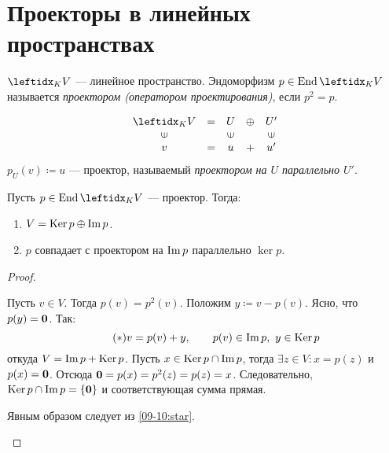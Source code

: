 \section{Проекторы в линейных пространствах}

\begin{defn}
    $\lsub{K}{V}$ --- линейное пространство. Эндоморфизм $p \in \End \lsub{K}{V}$ называется \textit{проектором (оператором проектирования)}, если $p^2 = p$.
\end{defn}

\begin{exmpl}
    $$\begin{array}{ c c c c c }
        \lsub{K}{V} & = & U     & \oplus & U'    \\
        \inup       &   & \inup &        & \inup \\
        v           & = & u     & +      & u'
    \end{array}$$
    $p_U(v) \coloneqq u$ --- проектор, называемый \textit{проектором на $U$ параллельно $U'$}.
\end{exmpl}

\begin{thm*}
    Пусть $p \in \End \lsub{K}{V}$ --- проектор. Тогда:
    \begin{enumerate}
        \item $V = \operatorname{Ker} p \oplus \operatorname{Im} p$.
        \item $p$ совпадает с проектором на $\operatorname{Im} p$ параллельно $\ker p$.
    \end{enumerate}
\end{thm*}

\begin{proof}
    \begin{proofpart}
        Пусть $v \in V$. Тогда $p(v) = p^2(v)$. Положим $y \coloneqq v - p(v)$. Ясно, что $p(y) = \mathbf{0}$. Так:
        \begin{equation}\label{09-10:star}\tag{$*$}
            v = p(v) + y, \qquad p(v) \in \operatorname{Im} p,\ y \in \operatorname{Ker} p
        \end{equation}
        откуда $V = \operatorname{Im} p + \operatorname{Ker} p$. Пусть $x \in \operatorname{Ker} p \cap \operatorname{Im} p$, тогда $\exists z \in V \colon x = p(z)$ и $p(x) = \mathbf{0}$. Отсюда $\mathbf{0} = p(x) = p^2(z) = p(z) = x$. Следовательно, $\operatorname{Ker} p \cap \operatorname{Im} p = \{\mathbf{0}\}$ и соответствующая сумма прямая.
    \end{proofpart}
    \begin{proofpart}
        Явным образом следует из \eqref{09-10:star}.
    \end{proofpart}
\end{proof}